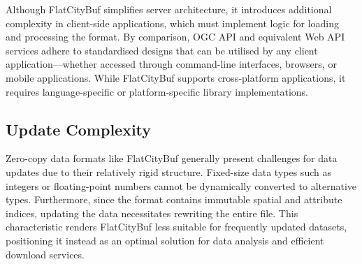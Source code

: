 Although FlatCityBuf simplifies server architecture, it introduces additional complexity in client-side applications, which must implement logic for loading and processing the format. By comparison, OGC API and equivalent Web API services adhere to standardised designs that can be utilised by any client application—whether accessed through command-line interfaces, browsers, or mobile applications. While FlatCityBuf supports cross-platform applications, it requires language-specific or platform-specific library implementations.

\subsection{Update Complexity}
\label{ease_of_update}

Zero-copy data formats like FlatCityBuf generally present challenges for data updates due to their relatively rigid structure. Fixed-size data types such as integers or floating-point numbers cannot be dynamically converted to alternative types. Furthermore, since the format contains immutable spatial and attribute indices, updating the data necessitates rewriting the entire file. This characteristic renders FlatCityBuf less suitable for frequently updated datasets, positioning it instead as an optimal solution for data analysis and efficient download services.
